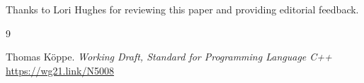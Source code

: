 \documentclass{wg21}
\begin{document}
Thanks to Lori Hughes for reviewing this paper and providing editorial feedback.




\renewcommand{\section}[2]{}%

\begin{thebibliography}{9}


Thomas Köppe.
\emph{Working Draft, Standard for Programming Language C++}\newline
\url{https://wg21.link/N5008}


\end{thebibliography}
\end{document}
